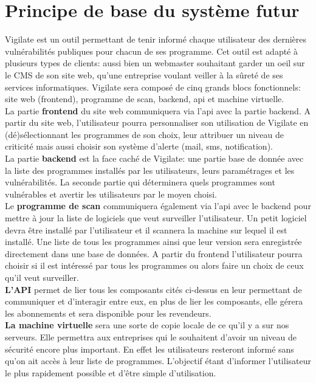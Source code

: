 \section{Principe de base du système futur}
Vigilate est un outil permettant de tenir informé chaque utilisateur des dernières vulnérabilités publiques pour chacun de ses programme. Cet outil est adapté à plusieurs types de clients: aussi bien un webmaster souhaitant garder un oeil sur le CMS de son site web, qu’une entreprise voulant veiller à la sûreté de ses services informatiques.
Vigilate sera composé de cinq grands blocs fonctionnels: site web (frontend), programme de scan, backend, api et machine virtuelle.
\\
La partie \textbf{frontend} du site web communiquera via l’api avec la partie backend. A partir du site web, l’utilisateur pourra personnaliser son utilisation de Vigilate en (dé)sélectionnant les programmes de son choix, leur attribuer un niveau de criticité mais aussi choisir son système d’alerte (mail, sms, notification).
\\
La partie \textbf{backend} est la face caché de Vigilate: une partie base de donnée avec la liste des programmes installés par les utilisateurs, leurs paramétrages et les vulnérabilités. La seconde partie qui déterminera quels programmes sont vulnérables et avertir les utilisateurs par le moyen choisi.
\\
Le \textbf{programme de scan} communiquera également via l’api avec le backend pour mettre à jour la liste de logiciels que veut surveiller l’utilisateur. Un petit logiciel devra être installé par l’utilisateur et il scannera la machine sur lequel il est installé. Une liste de tous les programmes ainsi que leur version sera enregistrée directement dans une base de données. A partir du frontend l’utilisateur pourra choisir si il est intéressé par tous les programmes ou alors faire un choix de ceux qu’il veut surveiller.
\\
\textbf{L’API}  permet de lier tous les composants cités ci-dessus en leur permettant de communiquer et d'interagir entre eux, en plus de lier les composants, elle gérera les abonnements et sera disponible pour les revendeurs.
\\
\textbf{La machine virtuelle} sera une sorte de copie locale de ce qu’il y a sur nos serveurs. Elle permettra aux entreprises qui le souhaitent d’avoir un niveau de sécurité encore plus important. En effet les utilisateurs resteront informé sans qu’on ait accès à leur liste de programmes.
L'objectif étant d’informer l’utilisateur le plus rapidement possible et d’être simple d’utilisation.\\


